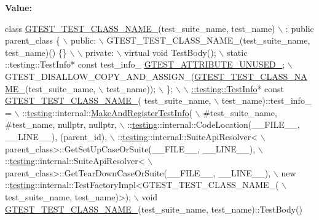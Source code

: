 {\bfseries Value\+:}
\begin{DoxyCode}
\textcolor{keyword}{class }\hyperlink{gtest-internal_8h_ad4bc4ec847a06e7de981e81c9bb116cf}{GTEST\_TEST\_CLASS\_NAME\_}(test\_suite\_name, test\_name)                    \(\backslash\)
      : \textcolor{keyword}{public} parent\_class \{                                                 \(\backslash\)
   public:                                                                    \(\backslash\)
    GTEST\_TEST\_CLASS\_NAME\_(test\_suite\_name, test\_name)() \{\}                   \(\backslash\)
                                                                              \(\backslash\)
   private:                                                                   \(\backslash\)
    virtual \textcolor{keywordtype}{void} TestBody();                                                  \(\backslash\)
    static ::testing::TestInfo* \textcolor{keyword}{const} test\_info\_ \hyperlink{gtest-port_8h_acdd47601a9376161c349a5881ccc6918}{GTEST\_ATTRIBUTE\_UNUSED\_};     \(\backslash\)
    GTEST\_DISALLOW\_COPY\_AND\_ASSIGN\_(\hyperlink{gtest-internal_8h_ad4bc4ec847a06e7de981e81c9bb116cf}{GTEST\_TEST\_CLASS\_NAME\_}(test\_suite\_name,   \(\backslash\)
                                                           test\_name));       \(\backslash\)
  \};                                                                          \(\backslash\)
                                                                              \(\backslash\)
  \hyperlink{classtesting_1_1TestInfo}{::testing::TestInfo}* \textcolor{keyword}{const} \hyperlink{gtest-internal_8h_ad4bc4ec847a06e7de981e81c9bb116cf}{GTEST\_TEST\_CLASS\_NAME\_}(
      test\_suite\_name,          \(\backslash\)
                                                    test\_name)::test\_info\_ =  \(\backslash\)
      ::\hyperlink{namespacetesting}{testing}::internal::\hyperlink{namespacetesting_1_1internal_a7ab4072540184e26119ad853f45059f7}{MakeAndRegisterTestInfo}(                          
       \(\backslash\)
          #test\_suite\_name, #test\_name, nullptr, nullptr,                     \(\backslash\)
          ::\hyperlink{namespacetesting}{testing}::internal::CodeLocation(\_\_FILE\_\_, \_\_LINE\_\_), (parent\_id), \(\backslash\)
          ::\hyperlink{namespacetesting}{testing}::internal::SuiteApiResolver<                              \(\backslash\)
              parent\_class>::GetSetUpCaseOrSuite(\_\_FILE\_\_, \_\_LINE\_\_),         \(\backslash\)
          ::\hyperlink{namespacetesting}{testing}::internal::SuiteApiResolver<                              \(\backslash\)
              parent\_class>::GetTearDownCaseOrSuite(\_\_FILE\_\_, \_\_LINE\_\_),      \(\backslash\)
          new ::\hyperlink{namespacetesting}{testing}::internal::TestFactoryImpl<GTEST\_TEST\_CLASS\_NAME\_(    \(\backslash\)
              test\_suite\_name, test\_name)>);                                  \(\backslash\)
  void \hyperlink{gtest-internal_8h_ad4bc4ec847a06e7de981e81c9bb116cf}{GTEST\_TEST\_CLASS\_NAME\_}(test\_suite\_name, test\_name)::TestBody()
\end{DoxyCode}
